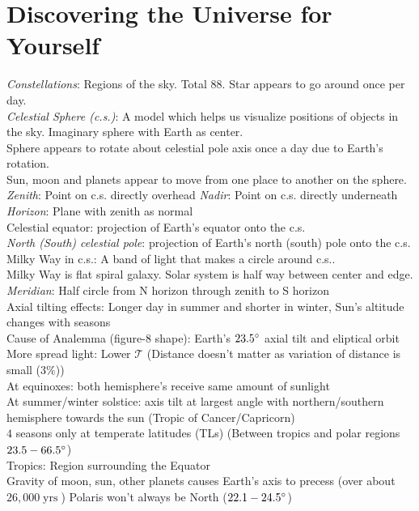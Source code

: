 \documentclass{article}
\DeclareMathOperator{\yrs}{yrs}
\begin{document}
\section{Discovering the Universe for Yourself}
\textit{Constellations}: Regions of the sky. Total $88$. Star appears to go around once per day.\\
\textit{Celestial Sphere (c.s.)}: A model which helps us visualize positions of objects in the sky. Imaginary sphere with Earth as center.\\
Sphere appears to rotate about celestial pole axis once a day due to Earth's rotation.\\
Sun, moon and planets appear to move from one place to another on the sphere.\\
\textit{Zenith}: Point on c.s. directly overhead \qquad \textit{Nadir}: Point on c.s. directly underneath \qquad \textit{Horizon}: Plane with zenith as normal\\
Celestial equator: projection of Earth’s equator onto the c.s.\\
\textit{North (South) celestial pole}: projection of Earth’s north (south) pole onto the c.s.\\
Milky Way in c.s.: A band of light that makes a circle around c.s..\\
Milky Way is flat spiral galaxy. Solar system is half way between center and edge.\\
\textit{Meridian}: Half circle from N horizon through zenith to S horizon\\
Axial tilting effects: Longer day in summer and shorter in winter, Sun's altitude changes with seasons\\
Cause of Analemma (figure-8 shape): Earth's $23.5\degree$ axial tilt and eliptical orbit\\
More spread light: Lower $\mathcal{T}$ (Distance doesn't matter as variation of distance is small ($3\%$))\\
At equinoxes: both hemisphere's receive same amount of sunlight\\
At summer/winter solstice: axis tilt at largest angle with northern/southern hemisphere towards the sun (Tropic of Cancer/Capricorn)\\
$4$ seasons only at temperate latitudes (TLs) (Between tropics and polar regions $23.5-66.5\degree$)\\
Tropics: Region surrounding the Equator\\
Gravity of moon, sun, other planets causes Earth's axis to precess (over about $26,000\yrs$) Polaris won't always be North ($22.1-24.5\degree$)\\
\end{document}
